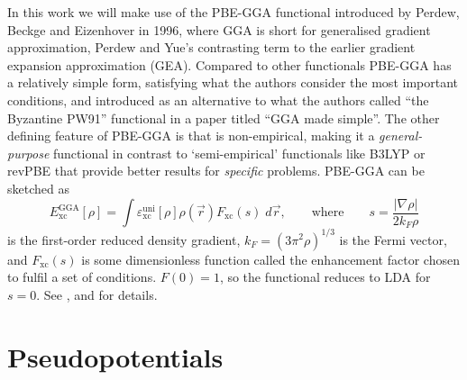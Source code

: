 \documentclass[11pt,bibliography=totoc,index=totoc]{scrbook}   %
\begin{document}
In this work we will make use of the PBE-GGA functional introduced by Perdew, Beckge and Eizenhover in 1996,\cite{PBE} where GGA is short for generalised gradient approximation, Perdew and Yue's contrasting term to the earlier gradient expansion approximation (GEA).\cite{Perdew:1986}
Compared to other functionals PBE-GGA has a relatively simple form, satisfying what the authors consider the most important conditions,
and introduced as an alternative to what the authors called ``the Byzantine PW91'' functional in a paper titled ``GGA made simple''.
The other defining feature of PBE-GGA is that is non-empirical, making it a \emph{general-purpose} functional in contrast to `semi-empirical' functionals like B3LYP or revPBE that provide better results for \emph{specific} problems.
PBE-GGA can be sketched as
\begin{equation}
    E_{\text{xc}}^{\text{GGA}}[\rho] = \int  \varepsilon_{\text{xc}}^{\text{uni}}[\rho] \rho(\vec{r}) F_{\text{xc}}(s) \;d\vec{r},
    \qquad\text{where}\qquad s= \frac{|\nabla\rho|}{2k_F\rho} 
  \label{eq:pbegga}
\end{equation}
is the first-order reduced density gradient, $k_F=(3\pi^2\rho)^{1/3}$ is the Fermi vector, and $F_{\text{xc}}(s)$ is some dimensionless function called the enhancement factor chosen to fulfil a set of conditions. $F(0)=1$, so the functional reduces to LDA for $s=0$. See \cite{Perdew:1986}, \cite{PBE} and \cite[154]{Martin:2004} for details.


%
\section{Pseudopotentials}\label{sec:pseudopot}
%
\end{document}

